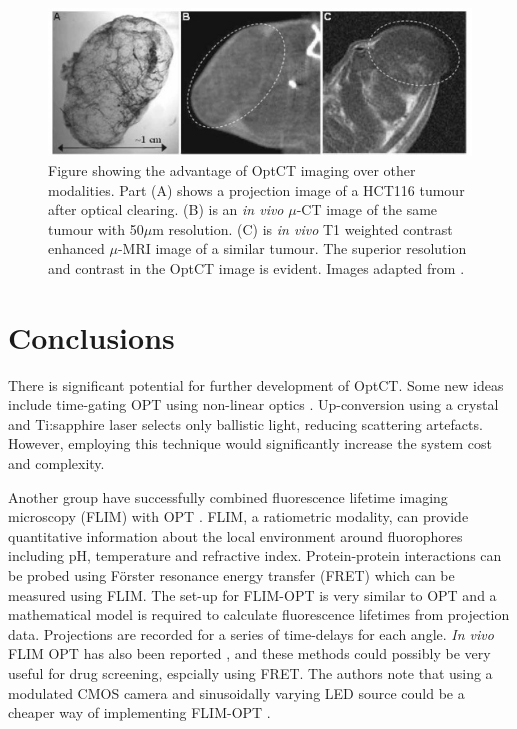 \documentclass[12pt]{article}
\begin{document}
\begin{figure}[H]
\centering
\includegraphics[scale=1]{Oldham_2006_tumourstaining.jpg}
\caption{Figure showing the advantage of OptCT imaging over other modalities. Part (A) shows a projection image of a HCT116 tumour after optical clearing. (B) is an \textit{in vivo} $\mu$-CT image of the same tumour with 50$\mu$m resolution. (C) is \textit{in vivo} T1 weighted contrast enhanced $\mu$-MRI image of a similar tumour. The superior resolution and contrast in the OptCT image is evident. Images  adapted from \cite{Oldham:2006}.}
\label{fig:tumourstaining}
\end{figure}





\newpage
\section{Conclusions}

There is significant potential for further development of OptCT. Some new ideas include time-gating OPT using non-linear optics \cite{Bassi:2010}. Up-conversion using a crystal and Ti:sapphire laser  selects only ballistic light,  reducing scattering artefacts. However, employing this technique would significantly increase the system cost and complexity.

Another group have successfully combined fluorescence lifetime imaging microscopy (FLIM) 
with OPT \cite{McGinty:2008ix}. FLIM, a ratiometric modality, can provide quantitative information about the local environment around fluorophores including pH, temperature and refractive index. Protein-protein interactions can be probed using F\"{o}rster  resonance energy transfer (FRET) which can be measured using FLIM.  The set-up for FLIM-OPT is very similar to OPT and  a mathematical model is required to calculate fluorescence lifetimes from projection data. Projections are recorded for a series of time-delays for each angle. \textit{In vivo} FLIM OPT has also been reported \cite{McGinty:2011vm}, and these methods could possibly be very useful for drug screening, espcially using FRET. The authors note that using a modulated CMOS camera and sinusoidally varying LED source could be a cheaper way of implementing FLIM-OPT \cite{McGinty:2011vm}.
\end{document}

